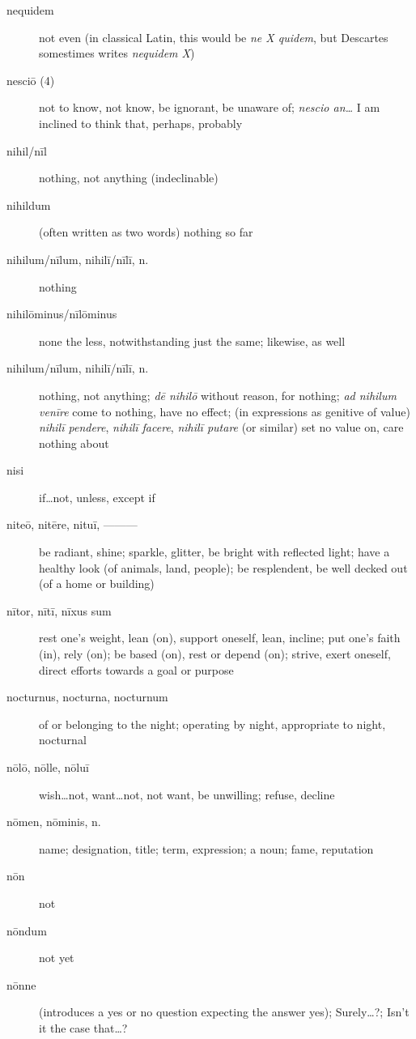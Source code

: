 \begin{description}
    \item[nequidem] not even (in classical Latin, this would be \textit{ne X quidem}, but Descartes somestimes writes \textit{nequidem X})
    \item[nesciō (4)] \marginnote{*}not to know, not know, be ignorant, be unaware of; \textit{nescio an\dots} I am inclined to think that, perhaps, probably
    \item[nihil/nīl] \marginnote{*}nothing, not anything (indeclinable)
    \item[nihildum] (often written as two words) nothing so far
    \item[nihilum/nīlum, nihilī/nīlī, n.] nothing
    \item[nihilōminus/nīlōminus] none the less, notwithstanding just the same; likewise, as well
    \item[nihilum/nīlum, nihilī/nīlī, n.] nothing, not anything; \textit{dē nihilō} without reason, for nothing; \textit{ad nihilum venīre} come to nothing, have no effect; (in expressions as genitive of value) \textit{nihilī pendere}, \textit{nihilī facere}, \textit{nihilī putare} (or similar) set no value on, care nothing about
    \item[nisi] \marginnote{*}if\dots not, unless, except if
    \item[niteō, nitēre, nituī, ———] be radiant, shine; sparkle, glitter, be bright with reflected light; have a healthy look (of animals, land, people); be resplendent, be well decked out (of a home or building)
    \item[nītor, nītī, nīxus sum] \marginnote{*}rest one's weight, lean (on), support oneself, lean, incline; put one's faith (in), rely (on); be based (on), rest or depend (on); strive, exert oneself, direct efforts towards a goal or purpose
    \item[nocturnus, nocturna, nocturnum] of or belonging to the night; operating by night, appropriate to night, nocturnal
    \item[nōlō, nōlle, nōluī] \marginnote{*}wish\dots not, want\dots not, not want, be unwilling; refuse, decline
    \item[nōmen, nōminis, n.] \marginnote{*}name; designation, title; term, expression; a noun; fame, reputation
    \item[nōn] \marginnote{*}not
    \item[nōndum] \marginnote{*}not yet
    \item[nōnne] \marginnote{*}(introduces a yes or no question expecting the answer yes); Surely\dots ?; Isn't it the case that\dots ?

\end{description}
